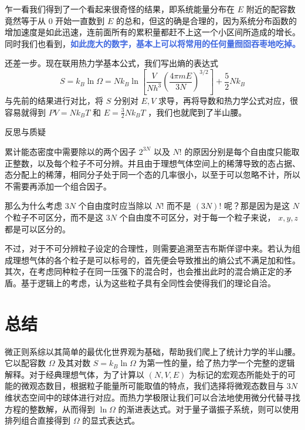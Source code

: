\documentclass[hyperref,UTF-8]{ctexbook}
\newcommand{\0}{\boldsymbol{0}}
\begin{document}
乍一看我们得到了一个看起来很奇怪的结果，即系统能量分布在 $E$ 附近的配容数竟然等于从 $0$ 开始一直数到 $E$ 的总和，但这的确是合理的，因为系统分布函数的增加速度是如此迅速，连前面所有的累积量都赶不上这一个小区间所造成的增长。同时我们也看到，\textcolor{RoyalBlue}{\textbf{\kaishu 如此庞大的数字，基本上可以将常用的任何量囫囵吞枣地吃掉。}} 

还差一步。现在联用热力学基本公式，我们写出熵的表达式
\[
    S = k_B\ln \Omega = Nk_B \ln\left[ \frac{V}{N h^3} \left(\frac{4\pi mE}{3N} \right)^{3/2}  \right] + \frac{5}{2} N k_B
\]
与先前的结果进行对比，将 $S$ 分别对 $E,V$ 求导，再将导数和热力学公式对应，很容易就得到 $PV = Nk_B T$ 和 $E = \frac{3}{2}N k_BT$ ，我们也就爬到了半山腰。

\begin{justification}{\kaishu 反思与质疑}
    \kaishu \fontsize{11pt}{16pt}
    
    \quad\quad 累计能态密度中需要除以的两个因子 $2^{3N}$ 以及 $N!$ 的原因分别是每个自由度只能取正整数，以及每个粒子不可分辨。并且由于理想气体空间上的稀薄导致的态占据、态分配上的稀薄，相同分子处于同一个态的几率很小，以至于可以忽略不计，所以不需要再添加一个组合因子。

    \quad\quad 那么为什么考虑 $3N$ 个自由度时应当除以 $N!$ 而不是 $(3N)!$ 呢？那是因为是这 $N$ 个粒子不可区分，而不是这 $3N$ 个自由度不可区分，对于每一个粒子来说， $x, y, z$ 都是可以区分的。

    \quad\quad 不过，对于不可分辨粒子设定的合理性，则需要追溯至吉布斯佯谬中来。若认为组成理想气体的各个粒子是可以标号的，首先便会导致推出的熵公式不满足加和性。其次，在考虑同种粒子在同一压强下的混合时，也会推出此时的混合熵正定的矛盾\cite{Pathria}。基于逻辑上的考虑，认为这些粒子具有全同性会使得我们的理论自洽。
\end{justification}

\section{总结}\label{sec:微正则总结}

微正则系综以其简单的最优化世界观为基础，帮助我们爬上了统计力学的半山腰。它以配容数 $\Omega $ 及其对数 $S = k_B \ln \Omega$ 为第一性的量，给了热力学一个完整的逻辑解释。对于经典理想气体，为了计算以 $(N,V,E)$ 为标记的宏观态所能处于的可能的微观态数目，根据粒子能量所可能取值的特点，我们选择将微观态数目与 $3N$ 维状态空间中的球体进行对应。而热力学极限让我们可以合法地使用微分代替寻找方程的整数解，从而得到 $\ln \Omega$ 的渐进表达式。对于量子谐振子系统，则可以使用排列组合直接得到 $\Omega$ 的显式表达式。
\end{document}
